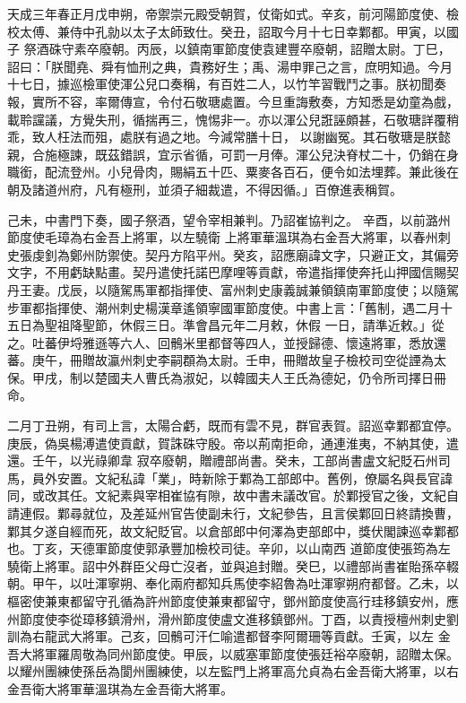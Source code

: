 
\begin{pinyinscope}

 天成三年春正月戊申朔，帝禦崇元殿受朝賀，仗衛如式。辛亥，前河陽節度使、檢校太傅、兼侍中孔勍以太子太師致仕。癸丑，詔取今月十七日幸鄴都。甲寅，以國子
 祭酒硃守素卒廢朝。丙辰，以鎮南軍節度使袁建豐卒廢朝，詔贈太尉。丁巳，詔曰：「朕聞堯、舜有恤刑之典，貴務好生；禹、湯申罪己之言，庶明知過。今月十七日，據巡檢軍使渾公兒口奏稱，有百姓二人，以竹竿習戰鬥之事。朕初聞奏報，實所不容，率爾傳宣，令付石敬瑭處置。今旦重誨敷奏，方知悉是幼童為戲，載聆讜議，方覺失刑，循揣再三，愧惕非一。亦以渾公兒誑誣頗甚，石敬瑭詳覆稍乖，致人枉法而殂，處朕有過之地。今減常膳十日，
 以謝幽冤。其石敬瑭是朕懿親，合施極諫，既茲錯誤，宜示省循，可罰一月俸。渾公兒決脊杖二十，仍銷在身職銜，配流登州。小兒骨肉，賜絹五十匹、粟麥各百石，便令如法埋葬。兼此後在朝及諸道州府，凡有極刑，並須子細裁遣，不得因循。」百僚進表稱賀。


己未，中書門下奏，國子祭酒，望令宰相兼判。乃詔崔協判之。
 辛酉，以前潞州節度使毛璋為右金吾上將軍，以左驍衛
 上將軍華溫琪為右金吾大將軍，以春州刺史張虔釗為鄭州防禦使。契丹方陷平州。癸亥，詔應廟諱文字，只避正文，其偏旁文字，不用虧缺點畫。契丹遣使托諾巴摩哩等貢獻，帝遣指揮使奔托山押國信賜契丹王妻。戊辰，以隨駕馬軍都指揮使、富州刺史康義誠兼領鎮南軍節度使；以隨駕步軍都指揮使、潮州刺史楊漢章遙領寧國軍節度使。中書上言：「舊制，遇二月十五日為聖祖降聖節，休假三日。準會昌元年二月敕，休假
 一日，請準近敕。」從之。吐蕃伊埒雅遜等六人、回鶻米里都督等四人，並授歸德、懷遠將軍，悉放還蕃。庚午，冊贈故瀛州刺史李嗣頵為太尉。壬申，冊贈故皇子檢校司空從諲為太保。甲戌，制以楚國夫人曹氏為淑妃，以韓國夫人王氏為德妃，仍令所司擇日冊命。



 二月丁丑朔，有司上言，太陽合虧，既而有雲不見，群官表賀。詔巡幸鄴都宜停。庚辰，偽吳楊溥遣使貢獻，賀誅硃守殷。帝以荊南拒命，通連淮夷，不納其使，遣還。壬午，以光祿卿韋
 寂卒廢朝，贈禮部尚書。癸未，工部尚書盧文紀貶石州司馬，員外安置。文紀私諱「業」，時新除于鄴為工部郎中。舊例，僚屬名與長官諱同，或改其任。文紀素與宰相崔協有隙，故中書未議改官。於鄴授官之後，文紀自請連假。鄴尋就位，及差延州官告使副未行，文紀參告，且言侯鄴回日終請換曹，鄴其夕遂自經而死，故文紀貶官。以倉部郎中何澤為吏部郎中，獎伏閣諫巡幸鄴都也。丁亥，天德軍節度使郭承豐加檢校司徒。辛卯，以山南西
 道節度使張筠為左驍衛上將軍。詔中外群臣父母亡沒者，並與追封贈。癸巳，以禮部尚書崔貽孫卒輟朝。甲午，以吐渾寧朔、奉化兩府都知兵馬使李紹魯為吐渾寧朔府都督。乙未，以樞密使兼東都留守孔循為許州節度使兼東都留守，鄧州節度使高行珪移鎮安州，應州節度使李從璋移鎮滑州，滑州節度使盧文進移鎮鄧州。丁酉，以責授檀州刺史劉訓為右龍武大將軍。己亥，回鶻可汗仁喻遣都督李阿爾珊等貢獻。壬寅，以左
 金吾大將軍羅周敬為同州節度使。甲辰，以威塞軍節度使張廷裕卒廢朝，詔贈太保。以耀州團練使孫岳為閬州團練使，以左監門上將軍高允貞為右金吾衛大將軍，以右金吾衛大將軍華溫琪為左金吾衛大將軍。




\end{pinyinscope}
